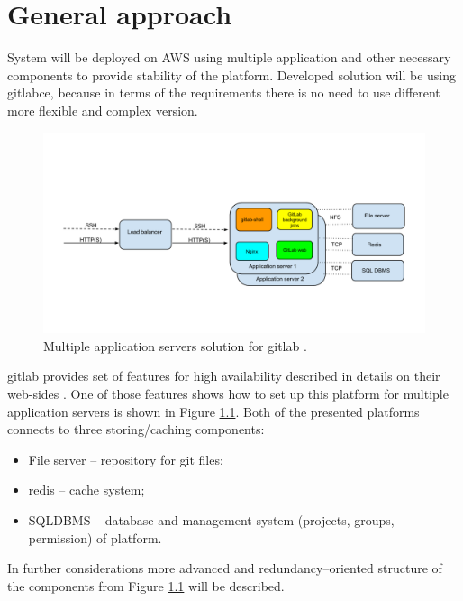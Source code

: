 \chapter{General approach} \label{chp:general-approach}
	System will be deployed on \gls{AWS} using multiple application and other necessary components to provide stability of the platform. Developed solution will be using \gls{gitlabce}, because in terms of the requirements there is no need to use different more flexible and complex version. 
	\begin{figure}[!htbp]
		\centering
		\includegraphics[width=1\textwidth]{img/Config_LB_appservers}
		\caption{Multiple application servers solution for \gls{gitlab} \cite{bib:gitlab-ha}.}
		\label{fig:multiple-application-servers}
	\end{figure} 
	\gls{gitlab} provides set of features for high availability described in details on their web-sides \cite{bib:gitlab-ha}. One of those features shows how to set up this platform for multiple application servers is shown in Figure \ref{fig:multiple-application-servers}.
	Both of the presented platforms connects to three storing/caching components:
	\begin{itemize}
		\item File server -- repository for \gls{git} files;
		\item \gls{redis} -- cache system;
		\item \gls{SQLDBMS} -- database and management system (projects, groups, permission) of platform.
	\end{itemize}
	In further considerations more advanced and redundancy--oriented structure of the components from Figure \ref{fig:multiple-application-servers} will be described. 
	
	